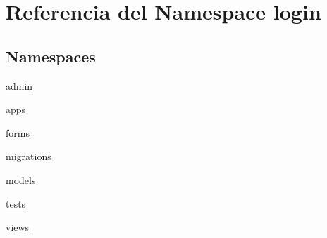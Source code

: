 \hypertarget{namespacelogin}{}\section{Referencia del Namespace login}
\label{namespacelogin}
\subsection*{Namespaces}
\begin{DoxyCompactItemize}
\item 
 \hyperlink{namespacelogin_1_1admin}{admin}
\item 
 \hyperlink{namespacelogin_1_1apps}{apps}
\item 
 \hyperlink{namespacelogin_1_1forms}{forms}
\item 
 \hyperlink{namespacelogin_1_1migrations}{migrations}
\item 
 \hyperlink{namespacelogin_1_1models}{models}
\item 
 \hyperlink{namespacelogin_1_1tests}{tests}
\item 
 \hyperlink{namespacelogin_1_1views}{views}
\end{DoxyCompactItemize}
